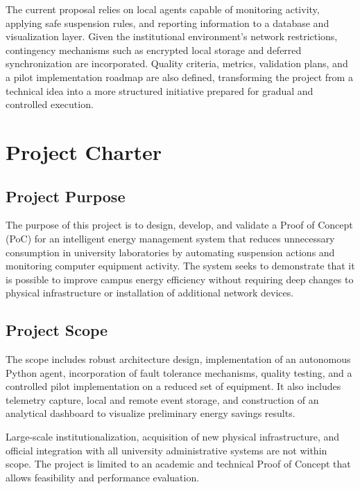 \documentclass[12pt,a4paper]{article}
\begin{document}
The current proposal relies on local agents capable of monitoring activity, applying safe suspension rules, and reporting information to a database and visualization layer. Given the institutional environment's network restrictions, contingency mechanisms such as encrypted local storage and deferred synchronization are incorporated. Quality criteria, metrics, validation plans, and a pilot implementation roadmap are also defined, transforming the project from a technical idea into a more structured initiative prepared for gradual and controlled execution.

\section{Project Charter}

\subsection{Project Purpose}
The purpose of this project is to design, develop, and validate a Proof of Concept (PoC) for an intelligent energy management system that reduces unnecessary consumption in university laboratories by automating suspension actions and monitoring computer equipment activity. The system seeks to demonstrate that it is possible to improve campus energy efficiency without requiring deep changes to physical infrastructure or installation of additional network devices.

\subsection{Project Scope}
The scope includes robust architecture design, implementation of an autonomous Python agent, incorporation of fault tolerance mechanisms, quality testing, and a controlled pilot implementation on a reduced set of equipment. It also includes telemetry capture, local and remote event storage, and construction of an analytical dashboard to visualize preliminary energy savings results.

Large-scale institutionalization, acquisition of new physical infrastructure, and official integration with all university administrative systems are not within scope. The project is limited to an academic and technical Proof of Concept that allows feasibility and performance evaluation.
\end{document}
